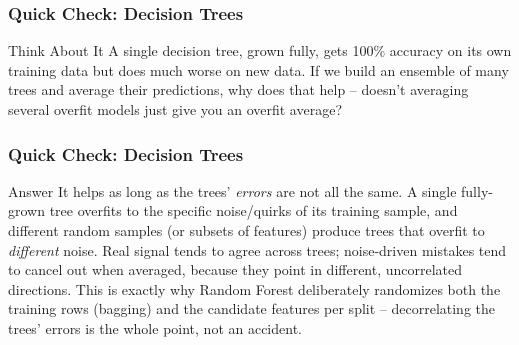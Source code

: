\begin{frame}[fragile]\frametitle{Quick Check: Decision Trees}
\begin{block}{Think About It}
A single decision tree, grown fully, gets 100\% accuracy on its own training data but does much worse on new data. If we build an ensemble of many trees and average their predictions, why does that help -- doesn't averaging several overfit models just give you an overfit average?
\end{block}
\end{frame}

\begin{frame}[fragile]\frametitle{Quick Check: Decision Trees}
\begin{block}{Answer}
It helps as long as the trees' \emph{errors} are not all the same. A single fully-grown tree overfits to the specific noise/quirks of its training sample, and different random samples (or subsets of features) produce trees that overfit to \emph{different} noise. Real signal tends to agree across trees; noise-driven mistakes tend to cancel out when averaged, because they point in different, uncorrelated directions. This is exactly why Random Forest deliberately randomizes both the training rows (bagging) and the candidate features per split -- decorrelating the trees' errors is the whole point, not an accident.
\end{block}
\end{frame}

